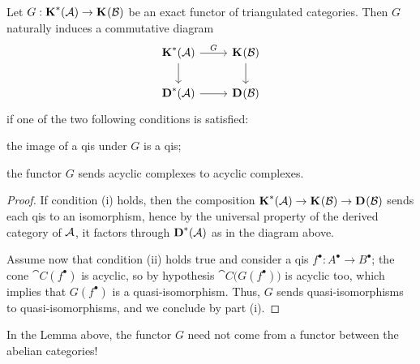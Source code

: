 \begin{lemma}\label{induced-derived-functor}
    Let $G:{\normalfont\textbf{K}}^{*}(\mathcal{A}) \to {\normalfont\textbf{K}}^{}(\mathcal{B})$
    be an exact functor of triangulated categories.
    Then $G$ naturally induces a commutative diagram
        \begin{equation*}
            \begin{tikzcd}
                \cat{K}^{*}(\Aa) \ar[r, "G"] \ar[d]
                & \cat{K}^{}(\Bb) \ar[d] \\
                \cat{D}^{*}(\Aa) \ar[r] & \cat{D}^{}(\Bb)
            \end{tikzcd}
        \end{equation*}
        if one of the two following conditions is satisfied:
        \begin{rmnumerate}
            \item the image of a qis under $G$ is a qis;
            \item the functor $G$ sends acyclic complexes to acyclic complexes.
        \end{rmnumerate}
        \begin{proof}
            If condition (i) holds, then the composition 
            ${\normalfont\textbf{K}}^{*}(\mathcal{A}) \to {\normalfont\textbf{K}}^{}(\mathcal{B}) \to {\normalfont\textbf{D}}^{}(\mathcal{B})$
            sends each qis to an isomorphism, hence by the universal
            property of the derived category of $\mathcal{A}$,
            it factors through ${\normalfont\textbf{D}}^{*}(\mathcal{A})$ as in the diagram above.

            Assume now that condition (ii) holds true and consider
            a qis $f^{\bullet} : A^{\bullet} \to B^{\bullet}$;
            the cone $\cat{C}(f^{\bullet})$ is acyclic,
            so by hypothesis $\cat{C}\big(G(f^{\bullet})\big)$ is acyclic too,
            which implies that $G(f^{\bullet})$ is a quasi-isomorphism.
            Thus, $G$ sends quasi-isomorphisms to quasi-isomorphisms,
            and we conclude by part (i).
        \end{proof}
\end{lemma}

\begin{rmk}
    In the Lemma above, the functor $G$ need not 
    come from a functor between the abelian categories!
\end{rmk}

